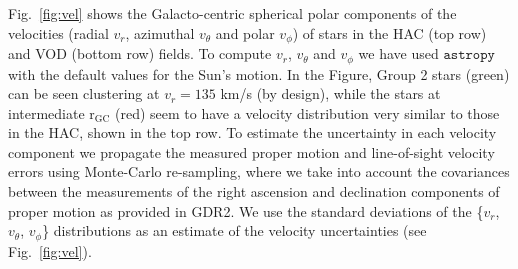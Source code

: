 \documentclass[a4paper,useAMS,usenatbib]{mnras}
\begin{document}
Fig.~\ref{fig:vel} shows the Galacto-centric spherical polar
components of the velocities (radial $v_{r}$, azimuthal $v_{\theta}$
and polar $v_{\phi}$) of stars in the HAC (top row) and VOD (bottom
row) fields. To compute $v_{r}$, $v_{\theta}$ and $v_{\phi}$ we have
used $\texttt{astropy}$ \citep{astropy} with the default values for
the Sun's motion. In the Figure, Group 2 stars (green) can be seen
clustering at $v_{r} = 135$ km/s (by design), while the stars at
intermediate $\mathrm{r_{GC}}$ (red) seem to have a velocity
distribution very similar to those in the HAC, shown in the top
row. To estimate the uncertainty in each velocity component we
propagate the measured proper motion and line-of-sight velocity errors
using Monte-Carlo re-sampling, where we take into account the
covariances between the measurements of the right ascension and
declination components of proper motion as provided in GDR2. We use
the standard deviations of the \{$v_{r}$, $v_{\theta}$, $v_{\phi}$\}
distributions as an estimate of the velocity uncertainties (see
Fig.~\ref{fig:vel}).
%
%
\end{document}
